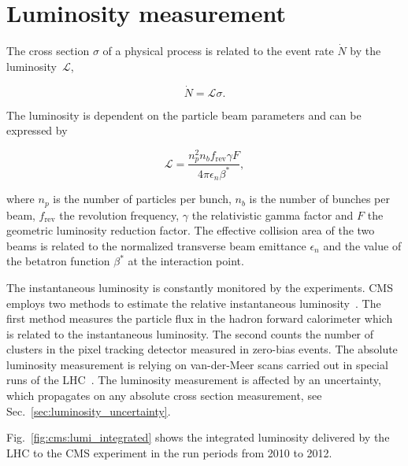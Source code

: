 \section{Luminosity measurement}
\label{sec:lumi_measurement}

The cross section $\sigma$ of a physical process is related to the
event rate $\dot{N}$ by the luminosity~$\mathcal{L}$,

\begin{equation*}
    \dot{N} = \mathcal{L} \sigma.
\end{equation*}

The luminosity is dependent on the particle beam parameters and can be expressed
by

\begin{equation*}
    \mathcal{L} = \frac{n_p^2
        n_b f_\mathrm{rev} \gamma F}{4 \pi \epsilon_n \beta^*},
\end{equation*}

where $n_p$ is the number of particles per bunch, $n_b$ is the number of bunches
per beam, $f_\mathrm{rev}$ the revolution frequency, $\gamma$ the relativistic
gamma factor and $F$ the geometric luminosity reduction factor. The effective
collision area of the two beams is related to the normalized transverse beam
emittance $\epsilon_n$ and the value of the betatron function $\beta^*$ at the
interaction point.

The instantaneous luminosity is constantly monitored by the experiments. CMS
employs two methods to estimate the relative instantaneous
luminosity~\cite{CMS-PAS-LUM-13-001}. The first method measures the particle
flux in the hadron forward calorimeter which is related to the instantaneous
luminosity. The second counts the number of clusters in the pixel tracking
detector measured in zero-bias events. The absolute luminosity measurement is
relying on van-der-Meer scans carried out in special runs of the
LHC~\cite{vanderMeer:296752}. The luminosity measurement is affected by an
uncertainty, which propagates on any absolute cross section measurement, see
Sec.~\ref{sec:luminosity_uncertainty}.

Fig.~\ref{fig:cms:lumi_integrated} shows the integrated luminosity delivered by
the LHC to the CMS experiment in the run periods from 2010 to 2012.

